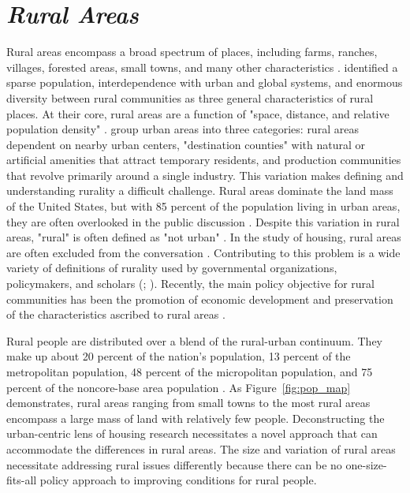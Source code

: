  

\section{\textit{Rural Areas}} 


 

Rural areas encompass a broad spectrum of places, including farms, ranches, villages, forested areas, small towns, and many other characteristics \citep{cromartie_defining_2008}. \citet{castle_conceptual_1998} identified a sparse population, interdependence with urban and global systems, and enormous diversity between rural communities as three general characteristics of rural places. At their core, rural areas are a function of "space, distance, and relative population density" \citep{castle_place_2011}. \citet{shoup_principles_2010} group urban areas into three categories: rural areas dependent on nearby urban centers, "destination counties" with natural or artificial amenities that attract temporary residents, and production communities that revolve primarily around a single industry. This variation makes defining and understanding rurality a difficult challenge. Rural areas dominate the land mass of the United States, but with 85 percent of the population living in urban areas, they are often overlooked in the public discussion \citep{pendall_future_2016}. Despite this variation in rural areas, "rural" is often defined as "not urban" \citep{national_coalition_for_the_homeless_rural_2009}. In the study of housing, rural areas are often excluded from the conversation \citep{gkartzios_housing_2017}. Contributing to this problem is a wide variety of definitions of rurality used by governmental organizations, policymakers, and scholars (\citealp{yousey_defining_2018}; \citealp{cromartie_defining_2008}). Recently, the main policy objective for rural communities has been the promotion of economic development and preservation of the characteristics ascribed to rural areas \citep{lichter_changing_2007}.  

 

Rural people are distributed over a blend of the rural-urban continuum. They make up about 20 percent of the nation's population, 13 percent of the metropolitan population, 48 percent of the micropolitan population, and 75 percent of the noncore-base area population \citep{isserman_national_2005}. As Figure~\ref{fig:pop_map} demonstrates, rural areas ranging from small towns to the most rural areas encompass a large mass of land with relatively few people. Deconstructing the urban-centric lens of housing research necessitates a novel approach that can accommodate the differences in rural areas. The size and variation of rural areas necessitate addressing rural issues differently because there can be no one-size-fits-all policy approach to improving conditions for rural people.  

